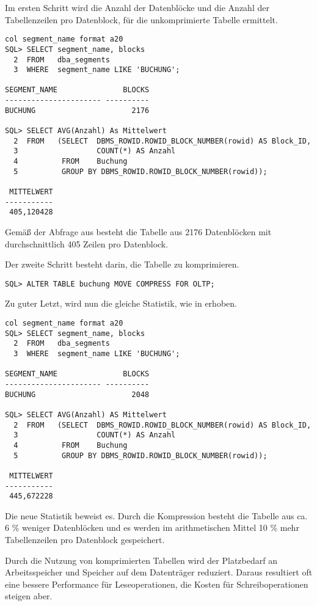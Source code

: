           Im ersten Schritt wird die Anzahl der Datenblöcke und die Anzahl der Tabellenzeilen pro Datenblock, für die unkomprimierte Tabelle  ermittelt.
          \begin{lstlisting}[caption={Anzahl der Datenblöcke + durchschnittliche Anzahl der Zeilen pro Block},label=admin307,language=oracle_sql,alsolanguage=sqlplus]
col segment_name format a20
SQL> SELECT segment_name, blocks
  2  FROM   dba_segments
  3  WHERE  segment_name LIKE 'BUCHUNG';

SEGMENT_NAME               BLOCKS
---------------------- ----------
BUCHUNG                      2176

SQL> SELECT AVG(Anzahl) As Mittelwert
  2  FROM   (SELECT  DBMS_ROWID.ROWID_BLOCK_NUMBER(rowid) AS Block_ID,
  3                  COUNT(*) AS Anzahl
  4          FROM    Buchung
  5          GROUP BY DBMS_ROWID.ROWID_BLOCK_NUMBER(rowid));

 MITTELWERT
-----------
 405,120428
          \end{lstlisting}
          Gemäß der Abfrage aus  besteht die Tabelle  aus 2176 Datenblöcken mit durchschnittlich 405 Zeilen pro Datenblock.

          Der zweite Schritt besteht darin, die Tabelle  zu komprimieren.
          \begin{lstlisting}[caption={Komprimieren der Tabelle \identifier{Buchung}},label=admin308,language=oracle_sql]
SQL> ALTER TABLE buchung MOVE COMPRESS FOR OLTP;
          \end{lstlisting}
          Zu guter Letzt, wird nun die gleiche Statistik, wie in  erhoben.
          \begin{lstlisting}[caption={Anzahl der Datenblöcke + durchschnittliche Anzahl der Zeilen pro Block nach der Kompression},label=admin309,language=oracle_sql,alsolanguage=sqlplus]
col segment_name format a20
SQL> SELECT segment_name, blocks
  2  FROM   dba_segments
  3  WHERE  segment_name LIKE 'BUCHUNG';

SEGMENT_NAME               BLOCKS
---------------------- ----------
BUCHUNG                      2048

SQL> SELECT AVG(Anzahl) AS Mittelwert
  2  FROM   (SELECT  DBMS_ROWID.ROWID_BLOCK_NUMBER(rowid) AS Block_ID,
  3                  COUNT(*) AS Anzahl
  4          FROM    Buchung
  5          GROUP BY DBMS_ROWID.ROWID_BLOCK_NUMBER(rowid));

 MITTELWERT
-----------
 445,672228
          \end{lstlisting}
          Die neue Statistik beweist es. Durch die Kompression besteht die Tabelle  aus ca. 6 \% weniger Datenblöcken und es werden im arithmetischen Mittel 10 \% mehr Tabellenzeilen pro Datenblock gespeichert.
          \begin{merke}
            Durch die Nutzung von komprimierten Tabellen wird der Platzbedarf an Arbeitsspeicher und Speicher auf dem Datenträger reduziert. Daraus resultiert oft eine bessere Performance für Leseoperationen, die Kosten für Schreiboperationen steigen aber.
          \end{merke}
